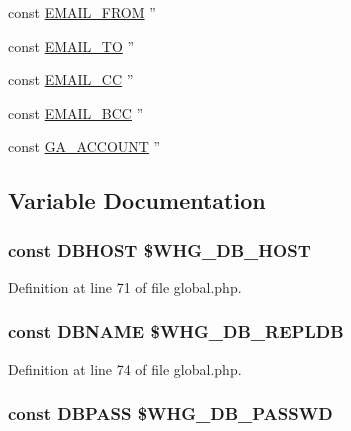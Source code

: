 \begin{DoxyCompactItemize}
\item 
const \hyperlink{global_8php_af97c5ff33b4f726b36d6db60e5b757eb}{E\-M\-A\-I\-L\-\_\-\-F\-R\-O\-M} ''
\item 
const \hyperlink{global_8php_adf9a2b18bea582e3d0ca5892d2c274fc}{E\-M\-A\-I\-L\-\_\-\-T\-O} ''
\item 
const \hyperlink{global_8php_a437cf4a502c60e7174f5d5a97a8b0fb4}{E\-M\-A\-I\-L\-\_\-\-C\-C} ''
\item 
const \hyperlink{global_8php_ae82459bfcf33ac1be174bfe1237a545d}{E\-M\-A\-I\-L\-\_\-\-B\-C\-C} ''
\item 
const \hyperlink{global_8php_a63584e945f652ffb7392f41c4f013922}{G\-A\-\_\-\-A\-C\-C\-O\-U\-N\-T} ''
\end{DoxyCompactItemize}


\subsection{Variable Documentation}
\hypertarget{global_8php_a40edb9274f7711736cc3ee12d2e5ddba}{
\subsubsection[{D\-B\-H\-O\-S\-T}]{\setlength{\rightskip}{0pt plus 5cm}const D\-B\-H\-O\-S\-T \$W\-H\-G\-\_\-\-D\-B\-\_\-\-H\-O\-S\-T}}\label{global_8php_a40edb9274f7711736cc3ee12d2e5ddba}


Definition at line 71 of file global.\-php.

\hypertarget{global_8php_af7d219badcc93cc3a13a604c769542bc}{
\subsubsection[{D\-B\-N\-A\-M\-E}]{\setlength{\rightskip}{0pt plus 5cm}const D\-B\-N\-A\-M\-E \$W\-H\-G\-\_\-\-D\-B\-\_\-\-R\-E\-P\-L\-D\-B}}\label{global_8php_af7d219badcc93cc3a13a604c769542bc}


Definition at line 74 of file global.\-php.

\hypertarget{global_8php_add7bef9fbed1ad1fa386dcb65fd5d813}{
\subsubsection[{D\-B\-P\-A\-S\-S}]{\setlength{\rightskip}{0pt plus 5cm}const D\-B\-P\-A\-S\-S \$W\-H\-G\-\_\-\-D\-B\-\_\-\-P\-A\-S\-S\-W\-D}}\label{global_8php_add7bef9fbed1ad1fa386dcb65fd5d813}


